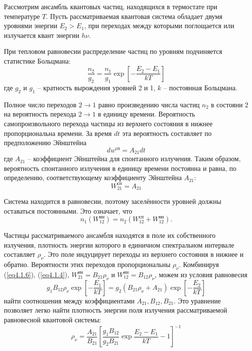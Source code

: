 
Рассмотрим ансамбль квантовых частиц, находящихся в термостате при
температуре \( T \). Пусть рассматриваемая квантовая система обладает двумя
уровнями энергии \( E_2 > E_1 \), при переходах между которыми поглощается
или излучается квант энергии \( h\nu \).

При тепловом равновесии распределение частиц по уровням подчиняется статистике
Больцмана:
\begin{equation}
    \frac{n_2}{g_2} = \frac{n_1}{g_1}\exp
        \left[ -\frac{E_2 - E_1}{kT}\right]
    \label{eq4.1.4}
\end{equation}
где \( g_2 \) и \( g_1 \) -- кратность вырождения уровней 2 и 1,
\( k \) -- постоянная Больцмана.

Полное число переходов \( 2 \rightarrow 1 \) равно произведению числа частиц
\( n_2 \) в состояни \( 2 \) на вероятность перехода \( 2 \rightarrow 1 \)
в единицу времени. Вероятность самопроизвольного перехода частицы из верхнего
состояния в нижнее пропорциональна времени. За время \( dt \) эта вероятность
составляет по предположению Эйнштейна
\[
    dw^\text{сп} = A_{21} dt
\]
где \( A_{21} \) -- коэффициент Эйнштейна для спонтанного излучения. Таким
образом, вероятность спонтанного излучения в единицу времени постоянна и равна,
по определению, соответствующему коэффициенту Эйнштейна
\( A_{21} \):
\begin{equation}
    W_{21}^\text{сп} = A_{21}
    \label{eq4.1.6}
\end{equation}

Система находится в равновесии, поэтому заселённости уровней должны оставаться
постоянными. Это означает, что
\[
    n_1(W_{12}^\text{ин}) = n_2(W_{12}^\text{сп} + W_{12}^\text{ин}).
\]

Частицы рассматриваемого ансамбля находятся в поле их собственного излучения,
плотность энергии которого в единичном спектральном интервале составляет
\( \rho_\nu \). Это поле индуцирует переходы из верхнего состояния в нижнее
и обратно. Вероятности этих переходов пропорциональны \( \rho_\nu \).
Комбинируя (\ref{eq4.1.6}), (\ref{eq4.1.4}),
\( W_{21}^\text{ин} = B_{21}\rho_\nu \) и
\( W_{12}^\text{ин} = B_{12}\rho_\nu \), можем из условия равновесия
\[
    g_1 B_{12} \rho_\nu \exp\left[ -\frac{E_1}{kT} \right] =
    g_2 \left( B_{21}\rho_\nu + A_{21} \right)
        \exp\left[ -\frac{E_2}{kT} \right]
\]
найти соотношения между коэффициентами \( A_{21}, B_{12}, B_{21} \). Это
уравнение позволяет легко найти плотность энергии поля излучения
рассматриваемой равновесной квантовой системы:
\[
    \rho_\nu = \frac{A_{21}}{B_{21}}
        \left[
            \frac{g_1 B_{12}}{g_2 B_{21}}\exp\frac{E_2 - E_1}{kT} - 1
        \right]^{-1}
\]

